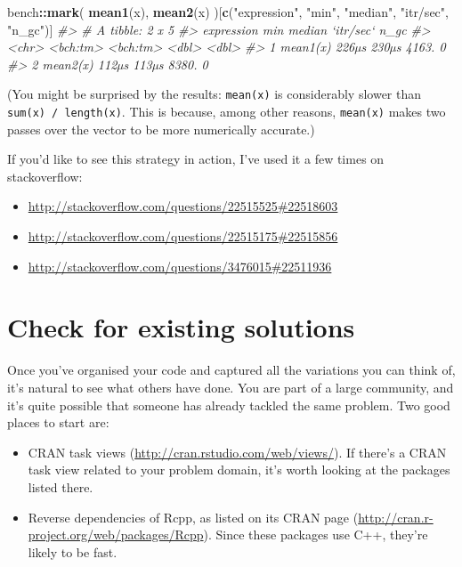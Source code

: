 \documentclass[]{book}
\newenvironment{Shaded}{\begin{snugshade}}{\end{snugshade}}
\newcommand{\CommentTok}[1]{\textcolor[rgb]{0.37,0.37,0.37}{\textit{#1}}}
\newcommand{\KeywordTok}[1]{\textcolor[rgb]{0.27,0.27,0.27}{\textbf{#1}}}
\newcommand{\NormalTok}[1]{#1}
\newcommand{\OperatorTok}[1]{\textcolor[rgb]{0.43,0.43,0.43}{\textbf{#1}}}
\newcommand{\StringTok}[1]{\textcolor[rgb]{0.5,0.5,0.5}{#1}}
\providecommand{\tightlist}{%
  \setlength{\itemsep}{0pt}\setlength{\parskip}{0pt}}
\renewcommand{\href}[2]{#2 (\url{#1})}
\begin{document}
\begin{Shaded}
\begin{Highlighting}[]
\NormalTok{bench}\OperatorTok{::}\KeywordTok{mark}\NormalTok{(}
  \KeywordTok{mean1}\NormalTok{(x),}
  \KeywordTok{mean2}\NormalTok{(x)}
\NormalTok{)[}\KeywordTok{c}\NormalTok{(}\StringTok{"expression"}\NormalTok{, }\StringTok{"min"}\NormalTok{, }\StringTok{"median"}\NormalTok{, }\StringTok{"itr/sec"}\NormalTok{, }\StringTok{"n_gc"}\NormalTok{)]}
\CommentTok{#> # A tibble: 2 x 5}
\CommentTok{#>   expression      min   median `itr/sec`  n_gc}
\CommentTok{#>   <chr>      <bch:tm> <bch:tm>     <dbl> <dbl>}
\CommentTok{#> 1 mean1(x)      226µs    230µs     4163.     0}
\CommentTok{#> 2 mean2(x)      112µs    113µs     8380.     0}
\end{Highlighting}
\end{Shaded}

(You might be surprised by the results: \texttt{mean(x)} is considerably slower than \texttt{sum(x)\ /\ length(x)}. This is because, among other reasons, \texttt{mean(x)} makes two passes over the vector to be more numerically accurate.)

If you'd like to see this strategy in action, I've used it a few times on stackoverflow:

\begin{itemize}
\tightlist
\item
  \url{http://stackoverflow.com/questions/22515525\#22518603}
\item
  \url{http://stackoverflow.com/questions/22515175\#22515856}
\item
  \url{http://stackoverflow.com/questions/3476015\#22511936}
\end{itemize}

\hypertarget{already-solved}{%
\section{Check for existing solutions}\label{already-solved}}

Once you've organised your code and captured all the variations you can think of, it's natural to see what others have done. You are part of a large community, and it's quite possible that someone has already tackled the same problem. Two good places to start are:

\begin{itemize}
\item
  \href{http://cran.rstudio.com/web/views/}{CRAN task views}. If there's a
  CRAN task view related to your problem domain, it's worth looking at
  the packages listed there.
\item
  Reverse dependencies of Rcpp, as listed on its
  \href{http://cran.r-project.org/web/packages/Rcpp}{CRAN page}. Since these
  packages use C++, they're likely to be fast.
\end{itemize}
\end{document}
